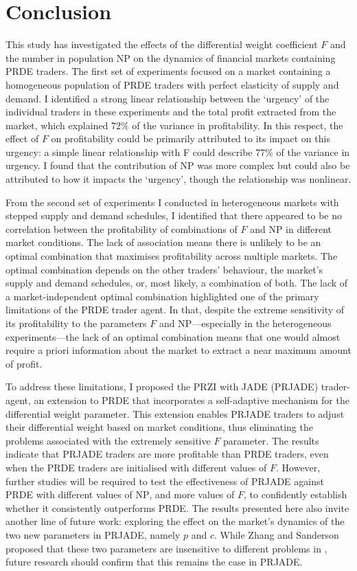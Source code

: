 \documentclass[conference]{IEEEtran}
\begin{document}
\section{Conclusion}

This study has investigated the effects of the differential weight coefficient $F$ and the number in population $\mathrm{NP}$ on the dynamics of financial markets containing PRDE traders.
The first set of experiments focused on a market containing a homogeneous population of PRDE traders with perfect elasticity of supply and demand.
I identified a strong linear relationship between the `urgency' of the individual traders in these experiments and the total profit extracted from the market, which explained 72\% of the variance in profitability.
In this respect, the effect of $F$ on profitability could be primarily attributed to its impact on this urgency: a simple linear relationship with F could describe 77\% of the variance in urgency.
I found that the contribution of $\mathrm{NP}$ was more complex but could also be attributed to how it impacts the `urgency', though the relationship was nonlinear.

From the second set of experiments I conducted in heterogeneous markets with stepped supply and demand schedules, I identified that there appeared to be no correlation between the profitability of combinations of $F$ and $\mathrm{NP}$ in different market conditions.
The lack of association means there is unlikely to be an optimal combination that maximises profitability across multiple markets.
The optimal combination depends on the other traders' behaviour, the market's supply and demand schedules, or, most likely, a combination of both.
The lack of a market-independent optimal combination highlighted one of the primary limitations of the PRDE trader agent.
In that, despite the extreme sensitivity of its profitability to the parameters $F$ and $\mathrm{NP}$---especially in the heterogeneous experiments---the lack of an optimal combination means that one would almost require a priori information about the market to extract a near maximum amount of profit.

To address these limitations, I proposed the PRZI with JADE (PRJADE) trader-agent, an extension to PRDE that incorporates a self-adaptive mechanism for the differential weight parameter.
This extension enables PRJADE traders to adjust their differential weight based on market conditions, thus eliminating the problems associated with the extremely sensitive $F$ parameter.
The results indicate that PRJADE traders are more profitable than PRDE traders, even when the PRDE traders are initialised with different values of $F$.
However, further studies will be required to test the effectiveness of PRJADE against PRDE with different values of $\mathrm{NP}$, and more values of $F$, to confidently establish whether it consistently outperforms PRDE.
The results presented here also invite another line of future work: exploring the effect on the market's dynamics of the two new parameters in PRJADE, namely $p$ and $c$.
While Zhang and Sanderson proposed that these two parameters are insensitive to different problems in \cite{ZhangSanderson}, future research should confirm that this remains the case in PRJADE.



\end{document}
